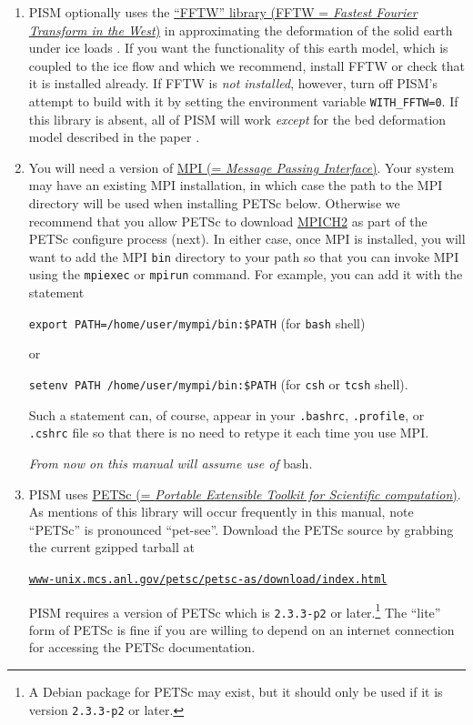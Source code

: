 \documentclass[11pt,final]{amsart}
\newcommand{\PETSCREV}{2.3.3-p2}
\renewcommand{\t}[1]{\texttt{#1}}
\begin{document}
\begin{enumerate}
\item PISM optionally uses the \href{http://www.fftw.org/}{``FFTW'' library (FFTW = \emph{Fastest Fourier Transform in the West})} in approximating the deformation of the solid earth under ice loads \cite{BLKfastearth}.  If you want the functionality of this earth model, which is coupled to the ice flow and which we recommend, install FFTW or check that it is installed already.  If FFTW is \emph{not installed}, however, turn off PISM's attempt to build with it by setting the environment variable \verb|WITH_FFTW=0|.   If this library is absent, all of PISM will work \emph{except} for the bed deformation model described in the paper \cite{BLKfastearth}.

\item You will need a version of \href{http://www-unix.mcs.anl.gov/mpi/}{MPI (= \emph{Message Passing Interface})}.  Your system may have an existing MPI installation, in which case the path to the MPI directory will be used when installing PETSc below.  Otherwise we recommend that you allow PETSc to download \href{http://www-unix.mcs.anl.gov/mpi/mpich2/}{MPICH2} as part of the PETSc configure process (next).  In either case, once MPI is installed, you will want to add the MPI \verb|bin| directory to your path so that you can invoke MPI using the \verb|mpiexec| or \verb|mpirun| command.  For example, you can add it with the statement

\verb|export PATH=/home/user/mympi/bin:$PATH|  \qquad (for \verb|bash| shell)

\noindent or

\verb|setenv PATH /home/user/mympi/bin:$PATH|  \qquad (for \verb|csh| or \verb|tcsh| shell).

\noindent Such a statement can, of course, appear in your \verb|.bashrc|, \verb|.profile|, or \verb|.cshrc| file so that there is no need to retype it each time you use MPI.

\medskip
\centerline{\emph{From now on this manual will assume use of} bash.}
\medskip

\item PISM uses   \href{http://www-unix.mcs.anl.gov/petsc/petsc-2/index.html}{PETSc (= \emph{Portable Extensible Toolkit for Scientific computation})}.  As mentions of this library will occur frequently in this manual, note ``PETSc'' is pronounced ``pet-see''.  Download the PETSc source by grabbing the current gzipped tarball at  
   \centerline{\href{http://www-unix.mcs.anl.gov/petsc/petsc-as/download/index.html}{\t{www-unix.mcs.anl.gov/petsc/petsc-as/download/index.html}}}
PISM requires a version of PETSc which is \texttt{\PETSCREV} or later.\footnote{A Debian package for PETSc may exist, but it should only be used if it is version \texttt{\PETSCREV} or later.}   The ``lite'' form of PETSc is fine if you are willing to depend on an internet connection for accessing the PETSc documentation. 


\end{enumerate}
\end{document}
